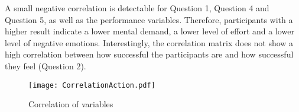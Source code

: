 A small negative correlation is detectable for Question 1, Question 4 and Question 5, as well as the performance variables. Therefore, participants with a higher result indicate a lower mental demand, a lower level of effort and a lower level of negative emotions. Interestingly, the correlation matrix does not show a high correlation between how successful the participants are and how successful they feel (Question 2). 
 \begin{figure}[h] %
\begin{center} %
  \texttt{[image: CorrelationAction.pdf]}
  \caption{Correlation of variables}
  \label{Correlation}
\end{center}
\end{figure}
